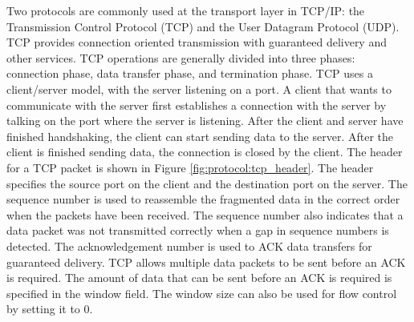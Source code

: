 Two protocols are commonly used at the transport layer in TCP/IP: the Transmission Control Protocol (TCP) and the User Datagram Protocol (UDP). TCP provides connection oriented transmission with guaranteed delivery and other services. TCP operations are generally divided into three phases: connection phase, data transfer phase, and termination phase. TCP uses a client/server model, with the server listening on a port. A client that wants to communicate with the server first establishes a connection with the server by talking on the port where the server is listening. After the client and server have finished handshaking, the client can start sending data to the server. After the client is finished sending data, the connection is closed by the client. The header for a TCP packet is shown in Figure \ref{fig:protocol:tcp_header}. The header specifies the source port on the client and the destination port on the server. The sequence number is used to reassemble the fragmented data in the correct order when the packets have been received. The sequence number also indicates that a data packet was not transmitted correctly when a gap in sequence numbers is detected. The acknowledgement number is used to ACK data transfers for guaranteed delivery. TCP allows multiple data packets to be sent before an ACK is required. The amount of data that can be sent before an ACK is required is specified in the window field. The window size can also be used for flow control by setting it to 0. \cite{ref:2005-kozierok-tcpip_guide}

